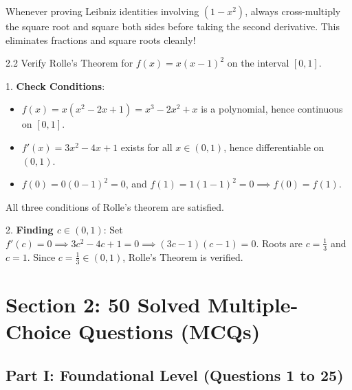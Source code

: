 \begin{examinertip}
Whenever proving Leibniz identities involving $(1-x^2)$, always cross-multiply the square root and square both sides before taking the second derivative. This eliminates fractions and square roots cleanly!
\end{examinertip}

\begin{subjectiveq}{2.2}
Verify Rolle's Theorem for $f(x) = x(x-1)^2$ on the interval $[0, 1]$.
\end{subjectiveq}

\begin{solbox}
1. \textbf{Check Conditions}:
\begin{itemize}
    \item $f(x) = x(x^2 - 2x + 1) = x^3 - 2x^2 + x$ is a polynomial, hence continuous on $[0, 1]$.
    \item $f'(x) = 3x^2 - 4x + 1$ exists for all $x \in (0, 1)$, hence differentiable on $(0, 1)$.
    \item $f(0) = 0(0-1)^2 = 0$, and $f(1) = 1(1-1)^2 = 0 \implies f(0) = f(1)$.
\end{itemize}
All three conditions of Rolle's theorem are satisfied.

2. \textbf{Finding $c \in (0, 1)$}:
Set $f'(c) = 0 \implies 3c^2 - 4c + 1 = 0 \implies (3c - 1)(c - 1) = 0$.
Roots are $c = \frac{1}{3}$ and $c = 1$.
Since $c = \frac{1}{3} \in (0, 1)$, Rolle's Theorem is verified.
\end{solbox}

\section{Section 2: 50 Solved Multiple-Choice Questions (MCQs)}

\subsection*{Part I: Foundational Level (Questions 1 to 25)}
\mcqitem{5}{In Lagrange's MVT $f(b)-f(a) = (b-a)f'(c)$, the point $c$ lies in:}{$[a, b]$}{$(a, b)$}{$(0, \infty)$}{$[a, \infty)$}

